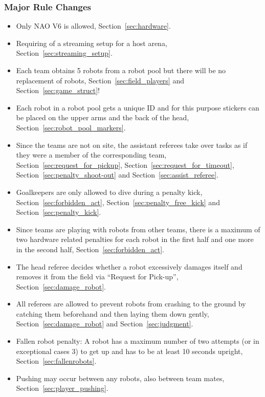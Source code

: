 \subsubsection{Major Rule Changes}
\label{sec:major_rule_changes}
\begin{itemize}
\item Only NAO V6 is allowed, \cf Section~\ref{sec:hardware}.
\item Requiring of a streaming setup for a host arena, \cf Section~\ref{sec:streaming_setup}.
\item Each team obtains 5 robots from a robot pool but there will be no replacement of robots, \cf Section~\ref{sec:field_players} and Section~\ref{sec:game_struct}! 
\item Each robot in a robot pool gets a unique ID and for this purpose stickers can be placed on the upper arms and the back of the head, \cf Section~\ref{sec:robot_pool_markers}.
\item Since the teams are not on site, the assistant referees take over tasks as if they were a member of the corresponding team, \cf Section~\ref{sec:request_for_pickup}, Section~\ref{sec:request_for_timeout}, Section~\ref{sec:penalty_shoot-out} and Section~\ref{sec:assist_referee}.
\item Goalkeepers are only allowed to dive during a penalty kick, \cf Section~\ref{sec:forbidden_act}, Section~\ref{sec:penalty_free_kick} and Section~\ref{sec:penalty_kick}.
\item Since teams are playing with robots from other teams, there is a maximum of two hardware related penalties for each robot in the first half and one more in the second half, \cf Section~\ref{sec:forbidden_act}.
\item The head referee decides whether a robot excessively damages itself and removes it from the field via ``Request for Pick-up'', \cf Section~\ref{sec:damage_robot}.
\item All referees are allowed to prevent robots from crashing to the ground by catching them beforehand and then laying them down gently, \cf Section~\ref{sec:damage_robot} and Section~\ref{sec:judgment}.
\item Fallen robot penalty: A robot has a maximum number of two attempts (or in exceptional cases 3) to get up and has to be at least 10 seconds upright, \cf Section~\ref{sec:fallenrobots}.
\item Pushing may occur between any robots, \ie also between team mates, \cf Section~\ref{sec:player_pushing}.
\end{itemize}